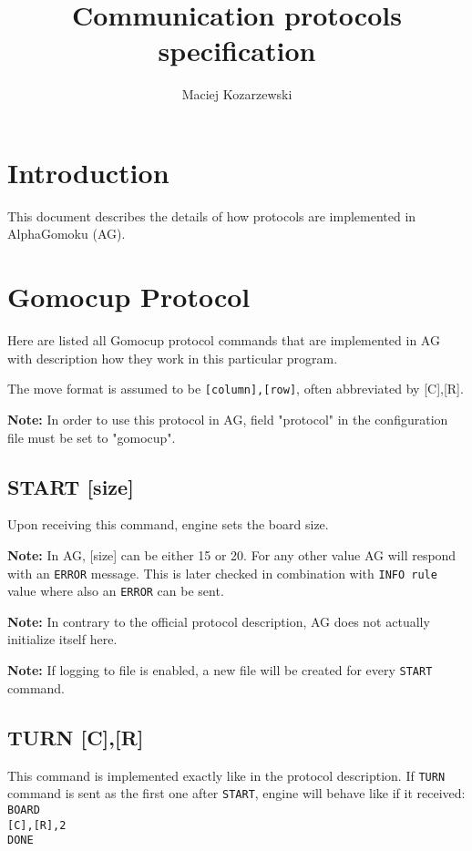 \documentclass[12pt,a4paper]{article}
\title{Communication protocols specification}
\author{Maciej Kozarzewski}
\date{ }
\begin{document}
\maketitle

\tableofcontents

\section{Introduction}
This document describes the details of how protocols are implemented in AlphaGomoku (AG).


\newpage
\section{Gomocup Protocol}
Here are listed all Gomocup protocol \cite{newprotocol} commands that are implemented in AG with description how they work in this particular program.

The move format is assumed to be \texttt{[column],[row]}, often abbreviated by [C],[R].

\textbf{Note:} In order to use this protocol in AG, field "protocol" in the configuration file must be set to "gomocup".

\subsection{START [size]}
\label{cmd_start}
Upon receiving this command, engine sets the board size.

\textbf{Note:} In AG, [size] can be either 15 or 20. For any other value AG will respond with an \texttt{ERROR} message. This is later checked in combination with \texttt{INFO rule} value where also an \texttt{ERROR} can be sent.

\textbf{Note:} In contrary to the official protocol description, AG does not actually initialize itself here.

\textbf{Note:} If logging to file is enabled, a new file will be created for every \texttt{START} command.


\subsection{TURN [C],[R]}
\label{cmd_turn}
This command is implemented exactly like in the protocol description. If \texttt{TURN} command is sent as the first one after \texttt{START}, engine will behave like if it received:\\
\texttt{BOARD} \\
\texttt{[C],[R],2} \\
\texttt{DONE}\\
\end{document}

